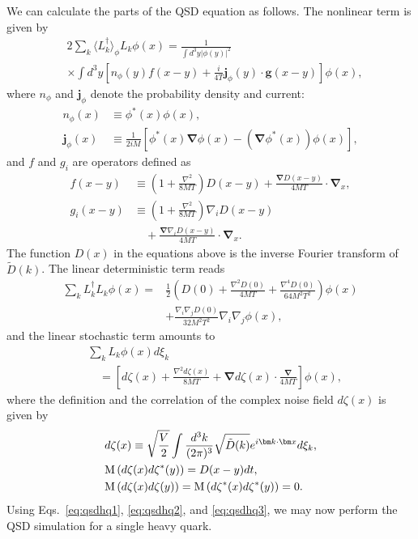 \documentclass[prd,11pt, amsmath, amsymb, aps, reprint, tightenlines, nofootinbib, longbibliography, abbrv, preprintnumbers]{revtex4-1}
\begin{document}
We can calculate the parts of the QSD equation as follows.
The nonlinear term is given by
\begin{align}
\label{eq:qsdhq1}
&2\sum_{k}\langle L_{k}^{\dagger}\rangle_{\phi}L_{k}\phi(x)
= \frac{1}{\int d^3 y |\phi(y)|^2} \\
&\times \int d^3 y
\left[n_{\phi}(y) f(x-y) +\frac{i}{4T}\bm j_{\phi}(y) \cdot \bm g(x-y) \right]\phi(x), \nonumber
\end{align}
where $n_{\phi}$ and $\bm j_{\phi}$ denote the probability density and current:
\begin{subequations}
\label{eq:nandj}
\begin{align}
n_{\phi}(x) &\equiv \phi^*(x)\phi(x), \\
\bm j_{\phi}(x) &\equiv \frac{1}{2iM} \left[\phi^*(x)\bm\nabla\phi(x) - \left(\bm\nabla\phi^*(x)\right) \phi(x)\right],
\end{align}
\end{subequations}
and $f$ and $g_i$ are operators defined as
\begin{subequations}
\label{eq:fandg}
\begin{align}
f(x-y) &\equiv \left(1+ \frac{\nabla^2}{8MT}\right)D(x-y) + \frac{\bm \nabla D(x-y)}{4MT}\cdot\bm\nabla_x,\\
g_i(x-y) &\equiv \left(1+ \frac{\nabla^2}{8MT}\right)\nabla_i D(x-y) \nonumber \\
 & \quad + \frac{\bm \nabla \nabla_i D(x-y)}{4MT}\cdot \bm\nabla_x. 
\end{align}
\end{subequations}
The function $D(x)$ in the equations above is the inverse Fourier transform of $\tilde D(k)$.
The linear deterministic term reads
\begin{align}
\label{eq:qsdhq2}
\sum_k L_k^{\dagger} L_k\phi(x)
=&\frac{1}{2}
\left(D(0)+\frac{\nabla^2 D(0)}{4MT} + \frac{\nabla^4 D(0)}{64M^2T^2}\right) \phi(x) \nonumber \\
&+ \frac{\nabla_i\nabla_j D(0)}{32M^2T^2}\nabla_i\nabla_j\phi(x),
\end{align}
and the linear stochastic term amounts to
\begin{align}
\label{eq:qsdhq3}
&\sum_k L_k\phi(x) d\xi_k \nonumber \\
& \quad =\left[d\zeta(x)+\frac{\nabla^2d\zeta(x)}{8MT}+ \bm\nabla d\zeta(x)\cdot \frac{\bm \nabla}{4MT}
\right]\phi(x),
\end{align}
where the definition and the correlation of the complex noise field $d\zeta(x)$ is given by
\begin{subequations}
\begin{align}
&d\zeta(x)\equiv \sqrt{\frac{V}{2}} \int \frac{d^3 k}{(2\pi)^3} \sqrt{\tilde D(k)} e^{i\bm k\cdot \bm x}d\xi_k, \\
&{\rm M}\left(d\zeta(x)d\zeta^*(y)\right) = D(x-y)dt, \\
&{\rm M}\left(d\zeta(x)d\zeta(y)\right) = {\rm M}\left(d\zeta^*(x)d\zeta^*(y)\right) = 0.
\end{align}
\end{subequations}
Using Eqs.~\eqref{eq:qsdhq1}, \eqref{eq:qsdhq2}, and \eqref{eq:qsdhq3}, we may now perform the QSD simulation for a single heavy quark.
\end{document}

